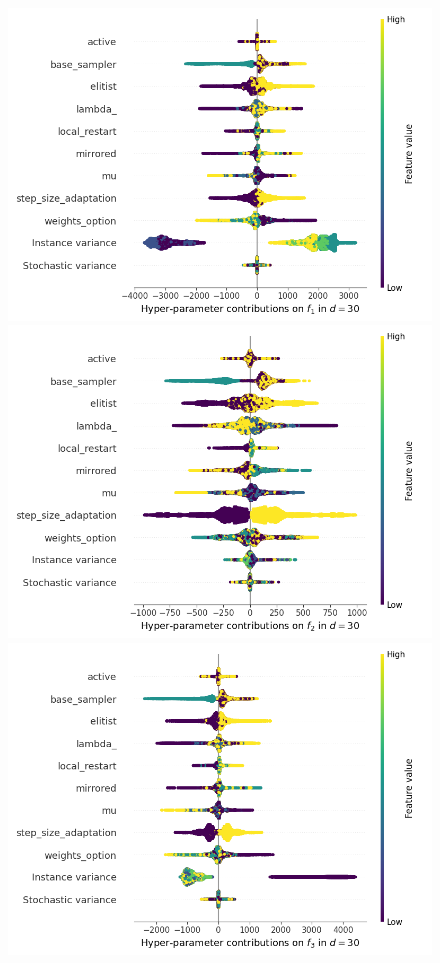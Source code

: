 \begin{figure}[t]
\centering
	\includegraphics[height=0.15\textheight,trim=0mm 0mm 30mm 0mm,clip]{cma_img_new/img_summary_f1_d30.png}
	\includegraphics[height=0.15\textheight,trim=60mm 0mm 30mm 0mm,clip]{cma_img_new/img_summary_f2_d30.png}
	\includegraphics[height=0.15\textheight,trim=60mm 0mm 30mm 0mm,clip]{cma_img_new/img_summary_f3_d30.png}

\end{figure}

